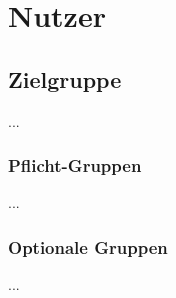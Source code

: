 %
%


\chapter{Nutzer}
\label{Nutzer}


\section{Zielgruppe}

...
\\


\subsection{Pflicht-Gruppen}

...
\\


\subsection{Optionale Gruppen}

...
\\


